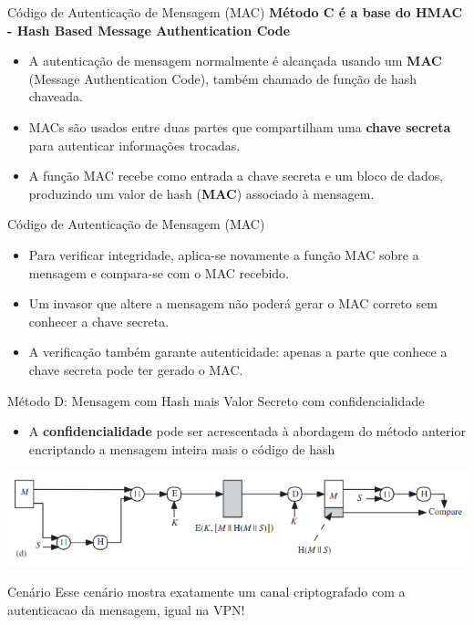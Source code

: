 \begin{frame}{Código de Autenticação de Mensagem (MAC)}
\textbf{Método C é a base do HMAC - Hash Based Message Authentication Code}
    \begin{itemize}
        \item A autenticação de mensagem normalmente é alcançada usando um \textbf{MAC} (Message Authentication Code), também chamado de função de hash chaveada.
        \item MACs são usados entre duas partes que compartilham uma \textbf{chave secreta} para autenticar informações trocadas.
        \item A função MAC recebe como entrada a chave secreta e um bloco de dados, produzindo um valor de hash (\textbf{MAC}) associado à mensagem.
        \end{itemize}

\end{frame}
\begin{frame}{Código de Autenticação de Mensagem (MAC)}
    \begin{itemize}
        \item Para verificar integridade, aplica-se novamente a função MAC sobre a mensagem e compara-se com o MAC recebido.
        \item Um invasor que altere a mensagem não poderá gerar o MAC correto sem conhecer a chave secreta.
        \item A verificação também garante autenticidade: apenas a parte que conhece a chave secreta pode ter gerado o MAC.
    \end{itemize}


\end{frame}

\begin{frame}{Método D: Mensagem com Hash mais Valor Secreto com confidencialidade}
    \begin{itemize}
        \item A \textbf{confidencialidade} pode ser acrescentada à abordagem do método anterior encriptando a mensagem inteira mais o código de hash
    \end{itemize}

    \centering
\includegraphics[width=0.7\linewidth]{Figuras/esquema4-hash.png}

\begin{block}{Cenário}
    Esse cenário mostra exatamente um canal criptografado com a autenticacao da mensagem, igual na VPN!
\end{block}
\end{frame}

